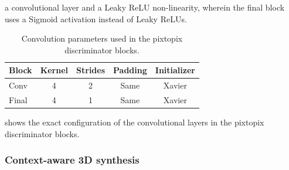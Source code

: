 a convolutional layer and a Leaky ReLU non-linearity, wherein the final block
uses a Sigmoid activation instead of Leaky ReLUs.
\begin{table}[h]
  \centering
  \begin{tabular}{lcccc}
    \toprule
    Block & Kernel & Strides & Padding & Initializer \\
    \midrule
    Conv & \num{4} & \num{2} & Same & Xavier \\
    Final  & \num{4} & \num{1} & Same & Xavier \\
    \bottomrule
  \end{tabular}
  \caption{Convolution parameters used in the pixtopix discriminator blocks.
  }\label{tab:pixtopix:conv}
\end{table}
 shows the exact configuration of the convolutional
layers in the pixtopix discriminator blocks.

\subsubsection{Context-aware 3D synthesis}

